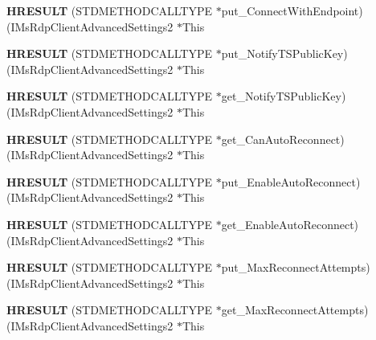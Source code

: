 \begin{DoxyCompactItemize}
{\bfseries H\+R\+E\+S\+U\+LT} (S\+T\+D\+M\+E\+T\+H\+O\+D\+C\+A\+L\+L\+T\+Y\+PE $\ast$put\+\_\+\+Connect\+With\+Endpoint)(I\+Ms\+Rdp\+Client\+Advanced\+Settings2 $\ast$This
\item 
\mbox{\label{struct_i_ms_rdp_client_advanced_settings2_vtbl_af1fcf682cf2b9bc571a22bc11738d830}} 
{\bfseries H\+R\+E\+S\+U\+LT} (S\+T\+D\+M\+E\+T\+H\+O\+D\+C\+A\+L\+L\+T\+Y\+PE $\ast$put\+\_\+\+Notify\+T\+S\+Public\+Key)(I\+Ms\+Rdp\+Client\+Advanced\+Settings2 $\ast$This
\item 
\mbox{\label{struct_i_ms_rdp_client_advanced_settings2_vtbl_a947ce28ccc79144b901a6bc09ebfa32c}} 
{\bfseries H\+R\+E\+S\+U\+LT} (S\+T\+D\+M\+E\+T\+H\+O\+D\+C\+A\+L\+L\+T\+Y\+PE $\ast$get\+\_\+\+Notify\+T\+S\+Public\+Key)(I\+Ms\+Rdp\+Client\+Advanced\+Settings2 $\ast$This
\item 
\mbox{\label{struct_i_ms_rdp_client_advanced_settings2_vtbl_a187d38fa180def29a13d05627907b4ec}} 
{\bfseries H\+R\+E\+S\+U\+LT} (S\+T\+D\+M\+E\+T\+H\+O\+D\+C\+A\+L\+L\+T\+Y\+PE $\ast$get\+\_\+\+Can\+Auto\+Reconnect)(I\+Ms\+Rdp\+Client\+Advanced\+Settings2 $\ast$This
\item 
\mbox{\label{struct_i_ms_rdp_client_advanced_settings2_vtbl_a85e7b5796c5d2b08360bf173bcfb8c79}} 
{\bfseries H\+R\+E\+S\+U\+LT} (S\+T\+D\+M\+E\+T\+H\+O\+D\+C\+A\+L\+L\+T\+Y\+PE $\ast$put\+\_\+\+Enable\+Auto\+Reconnect)(I\+Ms\+Rdp\+Client\+Advanced\+Settings2 $\ast$This
\item 
\mbox{\label{struct_i_ms_rdp_client_advanced_settings2_vtbl_a0de0611469329ebde090fc6322e9edc2}} 
{\bfseries H\+R\+E\+S\+U\+LT} (S\+T\+D\+M\+E\+T\+H\+O\+D\+C\+A\+L\+L\+T\+Y\+PE $\ast$get\+\_\+\+Enable\+Auto\+Reconnect)(I\+Ms\+Rdp\+Client\+Advanced\+Settings2 $\ast$This
\item 
\mbox{\label{struct_i_ms_rdp_client_advanced_settings2_vtbl_acab7d9199fc68be22ef19313e44a1286}} 
{\bfseries H\+R\+E\+S\+U\+LT} (S\+T\+D\+M\+E\+T\+H\+O\+D\+C\+A\+L\+L\+T\+Y\+PE $\ast$put\+\_\+\+Max\+Reconnect\+Attempts)(I\+Ms\+Rdp\+Client\+Advanced\+Settings2 $\ast$This
\item 
\mbox{\label{struct_i_ms_rdp_client_advanced_settings2_vtbl_a480766f8a3854287c41c6fe52dc0fdfa}} 
{\bfseries H\+R\+E\+S\+U\+LT} (S\+T\+D\+M\+E\+T\+H\+O\+D\+C\+A\+L\+L\+T\+Y\+PE $\ast$get\+\_\+\+Max\+Reconnect\+Attempts)(I\+Ms\+Rdp\+Client\+Advanced\+Settings2 $\ast$This
\end{DoxyCompactItemize}
